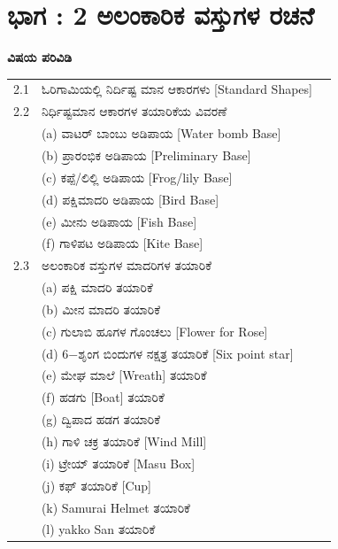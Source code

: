 
\chapter{ಭಾಗ :  2 ಅಲಂಕಾರಿಕ ವಸ್ತುಗಳ ರಚನೆ}\label{chap2}

\rhead[\small\sl ಓರಿಗಾಮಿ ಭಾಗ 2]{\small\thepage}

\textbf{\Large ವಿಷಯ ಪರಿವಿಡಿ}

\medskip
\medskip

{%
\begin{longtable}[l]{@{}>{}r>{\raggedright}p{9.1cm}>{}r@{}}
\hline
2.1 & ಓರಿಗಾಮಿಯಲ್ಲಿ ನಿರ್ದಿಷ್ಟ ಮಾನ ಆಕಾರಗಳು [Standard Shapes] \dotfill & \pageref{sec2.1}\\
2.2 & ನಿರ್ಧಿಷ್ಟಮಾನ ಆಕಾರಗಳ ತಯಾರಿಕೆಯ ವಿವರಣೆ \dotfill & {\pageref{sec2.2}}\\
& (a) ವಾಟರ್ ಬಾಂಬು ಅಡಿಪಾಯ [Water bomb Base] & \\
& (b) ಪ್ರಾರಂಭಿಕ ಅಡಿಪಾಯ [Preliminary Base] &\\
& (c) ಕಪ್ಪೆ/ಲಿಲ್ಲಿ ಅಡಿಪಾಯ [Frog/lily Base]&\\
& (d) ಪಕ್ಷಿಮಾದರಿ ಅಡಿಪಾಯ [Bird Base] & \\
& (e) ಮೀನು ಅಡಿಪಾಯ [Fish Base]  &\\
& (f) ಗಾಳಿಪಟ ಅಡಿಪಾಯ  [Kite Base]  & \\
2.3 & ಅಲಂಕಾರಿಕ ವಸ್ತುಗಳ ಮಾದರಿಗಳ ತಯಾರಿಕೆ \dotfill & \pageref{sec2.3}\\
& (a) ಪಕ್ಷಿ ಮಾದರಿ ತಯಾರಿಕೆ & \\
& (b) ಮೀನ ಮಾದರಿ ತಯಾರಿಕೆ  & \\
& (c) ಗುಲಾಬಿ ಹೂಗಳ ಗೊಂಚಲು [Flower for Rose] & \\
& (d) 6$-$ಶೃಂಗ ಬಿಂದುಗಳ ನಕ್ಷತ್ರ ತಯಾರಿಕೆ [Six point star] & \\
& (e) ಮೇಘ ಮಾಲೆ [Wreath] ತಯಾರಿಕೆ & \\
& (f)  ಹಡಗು [Boat] ತಯಾರಿಕೆ & \\
& (g) ದ್ವಿಪಾದ ಹಡಗ ತಯಾರಿಕೆ & \\
& (h) ಗಾಳಿ ಚಕ್ರ ತಯಾರಿಕೆ  [Wind Mill]& \\
& (i) ಟ್ರೇಯ್ ತಯಾರಿಕೆ [Masu Box]& \\
& (j) ಕಫ್ ತಯಾರಿಕೆ  [Cup]& \\
& (k) Samurai Helmet ತಯಾರಿಕೆ & \\
& (l) yakko San ತಯಾರಿಕೆ  & \\
\hline
\end{longtable}}\relax

